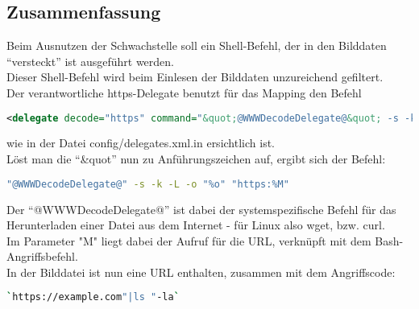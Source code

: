 \subsection{Zusammenfassung}\label{subsec:zusammenfassung}

Beim Ausnutzen der Schwachstelle soll ein Shell-Befehl, der in den Bilddaten "`versteckt"' ist ausgeführt werden.\\
Dieser Shell-Befehl wird beim Einlesen der Bilddaten unzureichend gefiltert.\\

Der verantwortliche https-Delegate benutzt für das Mapping den Befehl\\

\begin{lstlisting}[firstnumber=91, language=XML, caption=config/delegates.xml.in https-Delegate,label={lst:lstlisting}]
  <delegate decode="https" command="&quot;@WWWDecodeDelegate@&quot; -s -k -L -o &quot;%o&quot; &quot;https:%M&quot;"/>
\end{lstlisting}
\vspace{5mm}

wie in der Datei config/delegates.xml.in ersichtlich ist.\\

Löst man die "`&quot"' nun zu Anführungszeichen auf, ergibt sich der Befehl:\\
\begin{lstlisting}[firstnumber=1, language=Bash, caption=Aufgelöster https-Delegate-Befehl,label={lst:lstlisting}]
"@WWWDecodeDelegate@" -s -k -L -o "%o" "https:%M"
\end{lstlisting}
\vspace{5mm}

Der "`@WWWDecodeDelegate@"' ist dabei der systemspezifische Befehl für das Herunterladen einer Datei aus dem Internet - für Linux also wget, bzw. curl.\\
Im Parameter "M" liegt dabei der Aufruf für die URL, verknüpft mit dem Bash-Angriffsbefehl.\\

In der Bilddatei ist nun eine URL enthalten, zusammen mit dem Angriffscode:\\

\begin{lstlisting}[firstnumber=91, language=Bash, caption=Beispielhafter Inhalt einer Angriffsdatei,label={lst:lstlisting}]
`https://example.com"|ls "-la`
\end{lstlisting}
\vspace{5mm}

